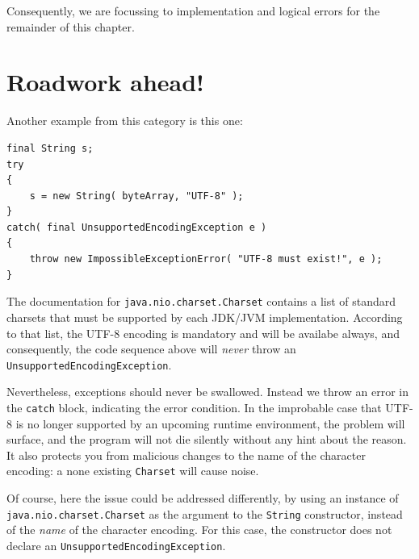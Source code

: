 Consequently, we are focussing to implementation and logical errors for the remainder of this chapter.





\chapter*{Roadwork ahead!}

Another example from this category is this one:
\begin{lstlisting}
final String s;
try
{
    s = new String( byteArray, "UTF-8" );
}
catch( final UnsupportedEncodingException e )
{
    throw new ImpossibleExceptionError( "UTF-8 must exist!", e );
}
\end{lstlisting}

The documentation for \lstinline|java.nio.charset.Charset| contains a list of standard charsets \autocite{ORACLE_DOC_CHARSET:StandardCharsets} that must be supported by each JDK/JVM implementation. According to that list, the UTF-8 \autocite{WIKIPEDIA:UTF8} encoding is mandatory and will be availabe always, and consequently, the code sequence above will \textit{never} throw an \lstinline|UnsupportedEncodingException|. 

Nevertheless, exceptions should never be swallowed. Instead we throw an error in the \lstinline|catch| block, indicating the error condition. In the improbable case that UTF-8 is no longer supported by an upcoming \Java runtime environment, the problem will surface, and the program will not die silently without any hint about the reason. It also protects you from malicious changes to the name of the character encoding: a none existing \lstinline|Charset| will cause noise.

Of course, here the issue could be addressed differently, by using an instance of \lstinline|java.nio.charset.Charset| \autocite{ORACLE_DOC_CHARSET_CLASS} as the argument to the \lstinline|String| constructor, instead of the \textit{name} of the character encoding. For this case, the constructor does not declare an \lstinline|UnsupportedEncodingException|.
 
